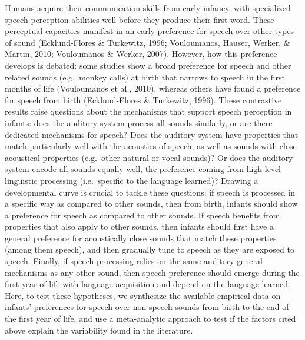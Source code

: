 \documentclass[
  english,
  man]{apa6}
\begin{document}
Humans acquire their communication skills from early infancy, with specialized speech perception abilities well before they produce their first word. These perceptual capacities manifest in an early preference for speech over other types of sound (Ecklund-Flores \& Turkewitz, 1996; Vouloumanos, Hauser, Werker, \& Martin, 2010; Vouloumanos \& Werker, 2007). However, how this preference develops is debated: some studies show a broad preference for speech and other related sounds (e.g.~monkey calls) at birth that narrows to speech in the first months of life (Vouloumanos et al., 2010), whereas others have found a preference for speech from birth (Ecklund-Flores \& Turkewitz, 1996). These contrastive results raise questions about the mechanisms that support speech perception in infants: does the auditory system process all sounds similarly, or are there dedicated mechanisms for speech? Does the auditory system have properties that match particularly well with the acoustics of speech, as well as sounds with close acoustical properties (e.g.~other natural or vocal sounds)? Or does the auditory system encode all sounds equally well, the preference coming from high-level linguistic processing (i.e.~specific to the language learned)? Drawing a developmental curve is crucial to tackle these questions: if speech is processed in a specific way as compared to other sounds, then from birth, infants should show a preference for speech as compared to other sounds. If speech benefits from properties that also apply to other sounds, then infants should first have a general preference for acoustically close sounds that match these properties (among them speech), and then gradually tune to speech as they are exposed to speech. Finally, if speech processing relies on the same auditory-general mechanisms as any other sound, then speech preference should emerge during the first year of life with language acquisition and depend on the language learned.\\
Here, to test these hypotheses, we synthesize the available empirical data on infants' preferences for speech over non-speech sounds from birth to the end of the first year of life, and use a meta-analytic approach to test if the factors cited above explain the variability found in the literature.
\end{document}
